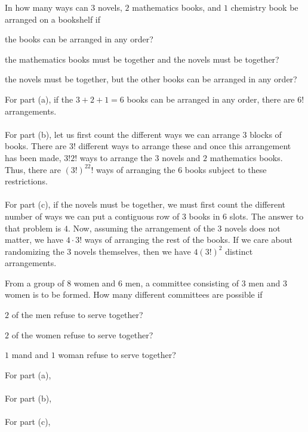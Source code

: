 \begin{problem}[Ross, \S 1, \# 11]
  In how many ways can \(3\) novels, \(2\) mathematics books, and \(1\)
  chemistry book be arranged on a bookshelf if
  \begin{alphlist}
  \item the books can be arranged in any order?
  \item the mathematics books must be together and the novels must be
    together?
  \item the novels must be together, but the other books can be arranged in
    any order?
  \end{alphlist}
\end{problem}
\begin{solution*}
  For part (a), if the \(3+2+1=6\) books can be arranged in any order,
  there are \(6!\) arrangements.
  \\\\
  For part (b), let us first count the different ways we can arrange \(3\)
  blocks of books. There are \(3!\) different ways to arrange these and
  once this arrangement has been made, \(3!2!\) ways to arrange the \(3\)
  novels and \(2\) mathematics books. Thus, there are \((3!)^22!\) ways of
  arranging the \(6\) books subject to these restrictions.
  \\\\
  For part (c), if the novels must be together, we must first count the
  different number of ways we can put a contiguous row of \(3\) books in
  \(6\) slots. The answer to that problem is \(4\). Now, assuming the
  arrangement of the \(3\) novels does not matter, we have \(4\cdot 3!\)
  ways of arranging the rest of the books. If we care about randomizing the
  \(3\) novels themselves, then we have \(4(3!)^2\) distinct arrangements.
\end{solution*}

\begin{problem}[Ross, \S 1, \# 19]
  From a group of \(8\) women and \(6\) men, a committee consisting of
  \(3\) men and \(3\) women is to be formed. How many different committees
  are possible if
  \begin{alphlist}
  \item \(2\) of the men refuse to serve together?
  \item \(2\) of the women refuse to serve together?
  \item \(1\) mand and \(1\) woman refuse to serve together?
  \end{alphlist}
\end{problem}
\begin{solution*}
  For part (a),
  \\\\
  For part (b),
  \\\\
  For part (c),
\end{solution*}

